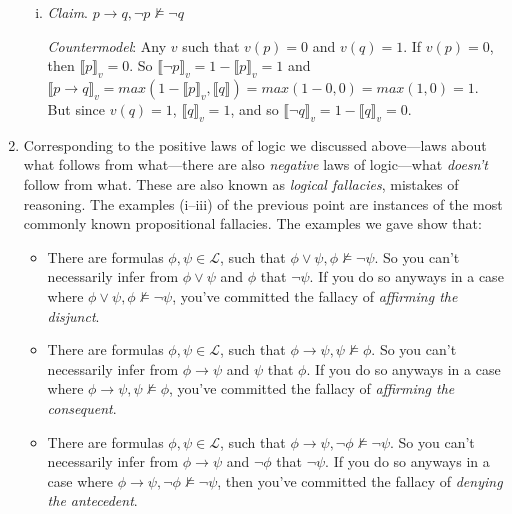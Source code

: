 \begin{enumerate}[\thesection.1]
\begin{enumerate}[(i)]
			\item \emph{Claim}. $p\to q, \neg p\nvDash \neg q$
			
			\emph{Countermodel}: Any $v$ such that $v(p)=0$ and $v(q)=1$. If $v(p)=0$, then $\llbracket p\rrbracket_v=0$. So $\llbracket \neg p\rrbracket_v=1-\llbracket p\rrbracket_v=1$ and $\llbracket p\to q\rrbracket_v=max(1-\llbracket p\rrbracket_v, \llbracket q\rrbracket)=max(1-0, 0)=max(1,0)=1$. But since $v(q)=1$, $\llbracket q\rrbracket_v=1$, and so  $\llbracket \neg q\rrbracket_v=1-\llbracket q\rrbracket_v=0$.
			
		\end{enumerate}
		
		\item Corresponding to the positive laws of logic we discussed above---laws about what follows from what---there are also \emph{negative} laws of logic---what \emph{doesn't} follow from what. These are also known as \emph{logical fallacies}, mistakes of reasoning. The examples (i--iii) of the previous point are instances of the most commonly known propositional fallacies. The examples we gave show that:
		
		\begin{itemize}
		
			\item There are formulas $\phi,\psi\in\mathcal{L}$, such that $\phi\lor\psi,\phi\nvDash\neg\psi$. So you can't necessarily infer from $\phi\lor\psi$ and $\phi$ that $\neg\psi$. If you do so anyways in a case where $\phi\lor\psi,\phi\nvDash\neg\psi$, you've committed the fallacy of \emph{affirming the disjunct}.
			
			\item There are formulas $\phi,\psi\in\mathcal{L}$, such that $\phi\to\psi,\psi\nvDash\phi$. So you can't necessarily infer from $\phi\to\psi$ and $\psi$ that $\phi$. If you do so anyways in a case where $\phi\to\psi,\psi\nvDash\phi$, you've committed the fallacy of \emph{affirming the consequent}.
			
			\item There are formulas $\phi,\psi\in\mathcal{L}$, such that $\phi\to\psi,\neg\phi\nvDash\neg\psi$. So you can't necessarily infer from $\phi\to\psi$ and $\neg\phi$ that $\neg\psi$. If you do so anyways in a case where $\phi\to\psi,\neg\phi\nvDash\neg\psi$, then you've committed the fallacy of \emph{denying the antecedent}.
		
		\end{itemize}
		

\end{enumerate}
